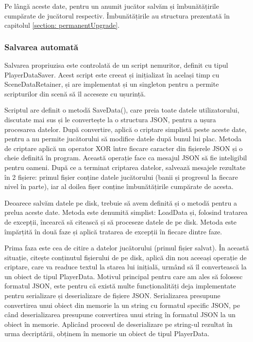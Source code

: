 \documentclass[12pt, a4paper]{article}
\begin{document}
	Pe lângă aceste date, pentru un anumit jucător salvăm și îmbunătățirile cumpărate de jucătorul respectiv. Îmbunătățirile au structura prezentată în capitolul \ref{section: permanentUpgrade}.
	
	
	
	
	
	\subsubsection{Salvarea automată}
	
	Salvarea propriuzisa este controlată de un script nemuritor, definit cu tipul PlayerDataSaver. Acest script este creeat și inițializat în același timp cu SceneDataRetainer, și are implementat și un singleton pentru a permite scripturilor din scenă să îl acceseze cu ușurință.
	\newline
	
	Scriptul are definit o metodă SaveData(), care preia toate datele utilizatorului, discutate mai sus și le convertește la o structura JSON, pentru a ușura procesarea datelor. După convertire, aplică o criptare simplistă peste aceste date, pentru a nu permite jucătorului să modifice datele după bunul lui plac. Metoda de criptare aplică un operator XOR între fiecare caracter din fișierele JSON și o cheie definită în program. Această operație face ca mesajul JSON să fie inteligibil pentru oameni. După ce a terminat criptarea datelor, salvează mesajele rezultate în 2 fișiere: primul fișier conține datele jucătorului (banii și progresul la fiecare nivel în parte), iar al doilea fișer conține îmbunătățirile cumpărate de acesta.
	\newline
	
	Deoarece salvăm datele pe disk, trebuie să avem definită și o metodă pentru a prelua aceste date. Metoda este denumită simplist: LoadData și, folosind tratarea de excepții, încearcă să citească și să proceseze datele de pe disk. Metoda este împărțită în două faze și aplică tratarea de excepții în fiecare dintre faze. 
	\newline
	
	Prima faza este cea de citire a datelor jucătorului (primul fișier salvat). În această situație, citește conținutul fișierului de pe disk, aplică din nou aceeași operație de criptare, care va readuce textul la starea lui inițială, urmând să îl convertească la un obiect de tipul PlayerData. Motivul principal pentru care am ales să folosesc formatul JSON, este pentru că există multe funcționalități deja implementate pentru serializare și deserializare de fișiere JSON. Serializarea presupune convertirea unui obiect din memorie la un string cu formatul specific JSON, pe când deserializarea presupune convertirea unui string în formatul JSON la un obiect în memorie. Aplicând procesul de deserializare pe string-ul rezultat în urma decriptării, obținem în memorie un obiect de tipul PlayerData.
	\newline
	
\end{document}
